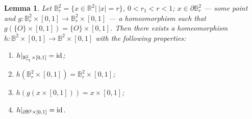 \documentclass[%
 aip,
 amsmath,amssymb,
preprint,%
]{revtex4-1}
\newtheorem{lemma}{Lemma}[section]
\begin{document}
\begin{lemma}\label{dehn}
Let $\mathbb B^2_r=\{x\in \mathbb R^2|\ |x|=r\}$, $0<r_1<r<1$; $x\in \partial \mathbb B^2_r$ --- some point and $g: \mathbb B^2_r\times [0,1]\to \mathbb B^2_r\times [0,1]$ --- a homeomorphism such that $g(\{O\}\times [0,1])=\{O\}\times [0,1]$. Then there exists a homeomorphism $h:\mathbb B^2\times [0,1]\to \mathbb B^2\times [0,1]$ with the following properties:
\begin{enumerate}
\item $h|_{\mathbb B^2_{r_1}\times [0,1]}={\rm id}$;
\item $h(\mathbb B^2_r\times [0,1])=\mathbb B^2_r\times [0,1]$;
\item $h(g(x\times [0,1]))=x\times [0,1]$;
\item $h|_{\partial \mathbb B^2\times [0,1]}={\rm id}$.
\end{enumerate}

\end{lemma}
\end{document}
